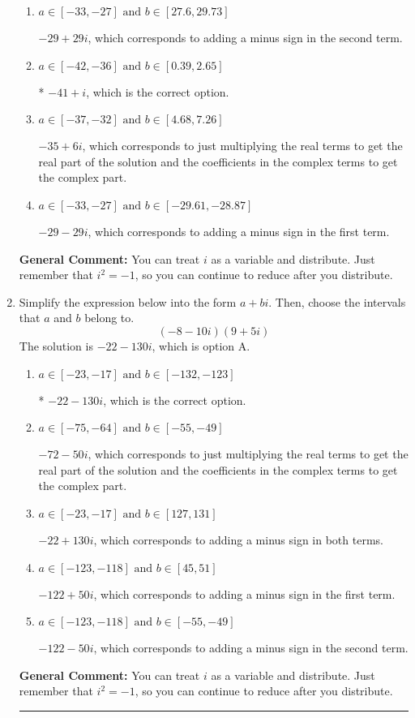 \documentclass{extbook}[14pt]
\newcommand{\litem}[1]{\item #1

\rule{\textwidth}{0.4pt}}
\begin{document}
\begin{enumerate}
{\begin{enumerate}[label=\Alph*.]
 $-41 - i$, which corresponds to adding a minus sign in both terms.
\item \( a \in [-33, -27] \text{ and } b \in [27.6, 29.73] \)

 $-29 + 29 i$, which corresponds to adding a minus sign in the second term.
\item \( a \in [-42, -36] \text{ and } b \in [0.39, 2.65] \)

* $-41 + i$, which is the correct option.
\item \( a \in [-37, -32] \text{ and } b \in [4.68, 7.26] \)

 $-35 + 6 i$, which corresponds to just multiplying the real terms to get the real part of the solution and the coefficients in the complex terms to get the complex part.
\item \( a \in [-33, -27] \text{ and } b \in [-29.61, -28.87] \)

 $-29 - 29 i$, which corresponds to adding a minus sign in the first term.
\end{enumerate}

\textbf{General Comment:} You can treat $i$ as a variable and distribute. Just remember that $i^2=-1$, so you can continue to reduce after you distribute.
}
\litem{
Simplify the expression below into the form $a+bi$. Then, choose the intervals that $a$ and $b$ belong to.
\[ (-8 - 10 i)(9 + 5 i) \]The solution is \( -22 - 130 i \), which is option A.\begin{enumerate}[label=\Alph*.]
\item \( a \in [-23, -17] \text{ and } b \in [-132, -123] \)

* $-22 - 130 i$, which is the correct option.
\item \( a \in [-75, -64] \text{ and } b \in [-55, -49] \)

 $-72 - 50 i$, which corresponds to just multiplying the real terms to get the real part of the solution and the coefficients in the complex terms to get the complex part.
\item \( a \in [-23, -17] \text{ and } b \in [127, 131] \)

 $-22 + 130 i$, which corresponds to adding a minus sign in both terms.
\item \( a \in [-123, -118] \text{ and } b \in [45, 51] \)

 $-122 + 50 i$, which corresponds to adding a minus sign in the first term.
\item \( a \in [-123, -118] \text{ and } b \in [-55, -49] \)

 $-122 - 50 i$, which corresponds to adding a minus sign in the second term.
\end{enumerate}

\textbf{General Comment:} You can treat $i$ as a variable and distribute. Just remember that $i^2=-1$, so you can continue to reduce after you distribute.
}
\end{enumerate}
\end{document}
